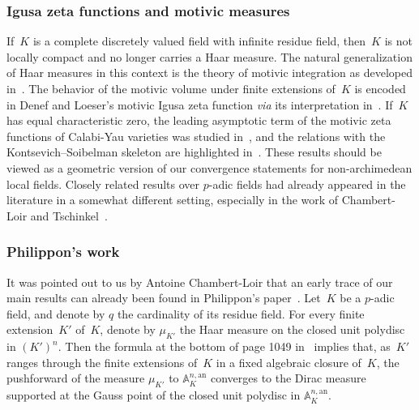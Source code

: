 \documentclass[JEP,XML,SOM,Unicode,NoFloatCountersInSection]{cedram}
\theoremstyle{definition}
\numberwithin{equation}{subsection}
\newcommand{\A}{\ensuremath{\mathbb{A}}}
\newcommand{\an}{\mathrm{an}}
\begin{document}
\subsubsection*{Igusa zeta functions and motivic measures}
If~$K$ is a complete discretely valued field with infinite residue field, then~$K$ is not locally compact and no longer carries a Haar measure. The natural generalization of Haar measures in this context is the theory of motivic integration as developed in~\cite{loeser-sebag}. The behavior of the motivic volume under finite extensions of~$K$ is encoded in Denef and Loeser's motivic Igusa zeta function {\em via} its interpretation in~\cite{nicaise-sebag}. If~$K$ has equal characteristic zero, the leading asymptotic term of the motivic zeta functions of Calabi-Yau varieties was studied in~\cite{halle-nicaise}, and the relations with the Kontsevich--Soibelman skeleton are highlighted in~\cite[3.2.3]{halle-nicaise}. These results should be viewed as a geometric version of our convergence statements for non-archimedean local fields.
Closely related results over $p$-adic fields had already appeared in the literature in a somewhat different setting, especially in the work of Chambert-Loir and Tschinkel~\cite{CLT}.

\subsubsection*{Philippon's work}
It was pointed out to us by Antoine Chambert-Loir that an early trace of our main results can already been found in Philippon's paper~\cite{philippon}. Let~$K$ be a $p$-adic field, and denote by $q$ the cardinality of its residue field.
For every finite extension~$K'$ of~$K$, denote by $\mu_{K'}$ the Haar measure on the closed unit polydisc in $(K')^n$.
Then the formula at the bottom of page 1049 in~\cite{philippon} implies that, as~$K'$ ranges through the finite extensions of~$K$ in a fixed algebraic closure of~$K$, the pushforward of the measure $\mu_{K'}$ to $\A^{n,\an}_K$ converges to the Dirac measure
supported at the Gauss point of the closed unit polydisc in $\A^{n,\an}_K$.
\end{document}
